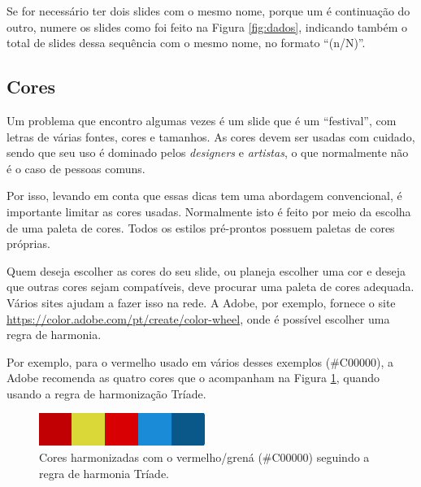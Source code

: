 Se for necessário ter dois slides com o mesmo nome, porque um é continuação do outro, numere os slides como foi feito na Figura \ref{fig:dados}, indicando também o total de slides dessa sequência com o mesmo nome, no formato ``(n/N)''.

\subsection{Cores}

Um problema que encontro algumas vezes é um slide que é um ``festival'', com letras de várias fontes, cores e tamanhos. As cores devem ser usadas com cuidado, sendo que seu uso é dominado pelos \textit{designers} e \textit{artistas}, o que normalmente não é o caso de pessoas comuns.

Por isso, levando em conta que essas dicas tem uma abordagem convencional, é importante limitar as cores usadas. Normalmente isto é feito por meio da escolha de uma paleta de cores. Todos os estilos pré-prontos possuem paletas de cores próprias.

Quem deseja escolher as cores do seu slide, ou planeja escolher uma cor e deseja que outras cores sejam compatíveis, deve procurar uma paleta de cores adequada. Vários sites ajudam a fazer isso na rede. A Adobe, por exemplo, fornece o site \url{https://color.adobe.com/pt/create/color-wheel}, onde é possível escolher uma regra de harmonia.

Por exemplo, para o vermelho usado em vários desses exemplos (\#C00000), a Adobe recomenda as quatro cores que o acompanham na Figura \ref{fig:coresdovermelhao}, quando usando a regra de harmonização Tríade.

\begin{figure}
    \centering
    \includegraphics[width=\tam\linewidth]{imagens/coresdovermelhao}
    \caption{Cores harmonizadas com o vermelho/grená (\#C00000) seguindo a regra de harmonia Tríade.}
    \label{fig:coresdovermelhao}
\end{figure}



